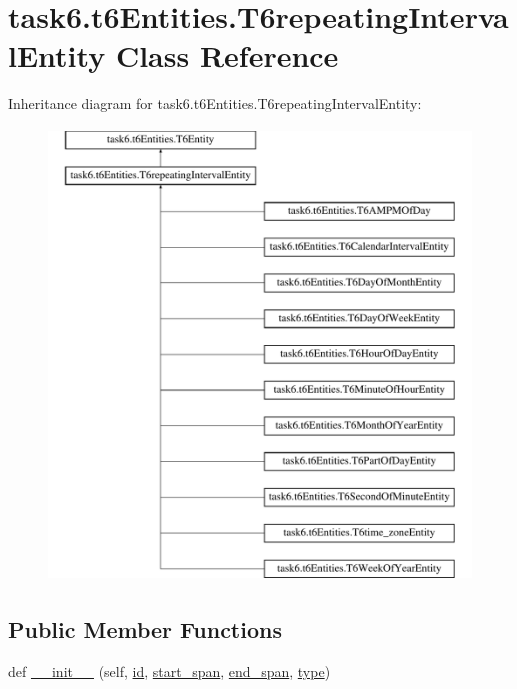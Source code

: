 \hypertarget{classtask6_1_1t6Entities_1_1T6repeatingIntervalEntity}{}\section{task6.\+t6\+Entities.\+T6repeating\+Interval\+Entity Class Reference}
\label{classtask6_1_1t6Entities_1_1T6repeatingIntervalEntity}
Inheritance diagram for task6.\+t6\+Entities.\+T6repeating\+Interval\+Entity\+:\begin{figure}[H]
\begin{center}
\leavevmode
\includegraphics[height=12.000000cm]{classtask6_1_1t6Entities_1_1T6repeatingIntervalEntity}
\end{center}
\end{figure}
\subsection*{Public Member Functions}
\begin{DoxyCompactItemize}
\item 
def \hyperlink{classtask6_1_1t6Entities_1_1T6repeatingIntervalEntity_a26cfdfdfe5c9a22651112680c641c159}{\+\_\+\+\_\+init\+\_\+\+\_\+} (self, \hyperlink{classtask6_1_1t6Entities_1_1T6Entity_afeeced8134bb3ebe0cfecc64d0ab46a4}{id}, \hyperlink{classtask6_1_1t6Entities_1_1T6Entity_a52779e9af8864dc98e8b02fc5b9b041a}{start\+\_\+span}, \hyperlink{classtask6_1_1t6Entities_1_1T6Entity_aeb402200b156cd9562c5111dfe777b98}{end\+\_\+span}, \hyperlink{classtask6_1_1t6Entities_1_1T6Entity_ae4299399be3ecbd68dbb9ae988bff5a8}{type})
\end{DoxyCompactItemize}
